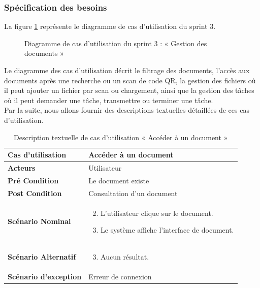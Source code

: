 \subsubsection{Spécification des besoins}
La figure \ref{fig:UseCaseDiagramSprint3} représente le diagramme de cas d'utilisation du sprint 3.


\begin{figure}[H]
  \centering
  \caption{Diagramme de cas d'utilisation du sprint 3 : « Gestion des documents »}
  \label{fig:UseCaseDiagramSprint3}
\end{figure}
Le diagramme des cas d'utilisation décrit le filtrage des documents, l'accès aux documents après une recherche ou un scan de code QR, la gestion des fichiers où il peut ajouter un fichier par scan ou chargement, ainsi que la gestion des tâches où il peut demander une tâche, transmettre ou terminer une tâche.\\

Par la suite, nous allons fournir des descriptions textuelles détaillées de ces cas d'utilisation.


\begin{longtable}{|p{5cm}|p{10cm}|}
  \caption{Description textuelle de cas d'utilisation « Accéder à un document »} \label{tab:DescriptionTextuelleDeCasDUtilisationAccéderAUnDocument} \\
\hline
\textbf{Cas d'utilisation}&Accéder à un document\\
\hline
\textbf{Acteurs}&Utilisateur\\
\hline
\textbf{Pré Condition}&Le document existe\\
\hline
\textbf{Post Condition}&Consultation d'un document\\
\hline
\textbf{Scénario Nominal}&
\vspace{-\baselineskip}
\begin{enumerate}
    \setcounter{enumi}{1}
    \item L'utilisateur clique sur le document.
    \item Le système affiche l'interface de document.
    
\end{enumerate}\\
\hline
\textbf{Scénario Alternatif}&
\vspace{-\baselineskip}
\begin{enumerate}
    \setcounter{enumi}{2}
    \item Aucun résultat.
\end{enumerate}\\
\hline
\textbf{Scénario d'exception}&Erreur de connexion\\
\hline

\end{longtable}

